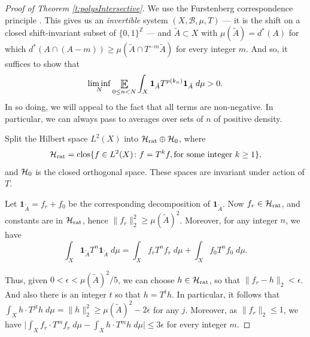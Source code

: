    
\begin{proof}
[Proof of Theorem \ref{t:polysIntersective}]
We use the Furstenberg correspondence principle \cite{MR0498471}. 
This gives us an \emph{invertible} system $(X,\mathcal B, \mu, T)$ --- it is the shift on a closed shift-invariant subset of $\{0,1\}^{\mathbb{Z}}$ --- 
and $\tilde A\subset X$ with $\mu(\tilde A)=d^\ast (A)$ for which 
$d^\ast(A\cap (A-m)) \geq \mu (\tilde A\cap T^{-m} \tilde A)$ for every integer $m$. 
And so, it suffices to show that 
\begin{equation} \label{eENA}
\liminf_N \Expectation _{0\leq n<N} \int_X \mathbf{1}_{\tilde A} T^{p(k_n)}  \mathbf{1}_{\tilde A} \;d\mu > 0. 
\end{equation}
In so doing, we will appeal to the fact that all terms are non-negative. In particular, we can always pass to averages over sets of $n$ of positive density. 


Split the Hilbert space $L^2(X)$ into $ \mathcal H _{\textup{rat}} \oplus \mathcal H _{\textup{0}}$, where 
\begin{equation}
 \mathcal H _{\textup{rat}}
 = \textup{clos}\{f\in L^2(X)\colon  
 f = T^k f, \textup{for some integer $k\geq 1$}   \}, 
 \end{equation}
and $\mathcal H _{\textup{0}}$ is the closed orthogonal space.  
These spaces are invariant under action of $T$.  


Let $\mathbf{1}_{\tilde A} = f_r + f_0$ be the corresponding decomposition of $\mathbf{1}_{\tilde A}$. Now $f_r \in \mathcal H _{\textup{rat}}$, and 
constants are in  $\mathcal H _{\textup{rat}}$, hence  $\lVert f_r\rVert_2^2 \geq  \mu(\tilde A)^2$. 
Moreover, for any integer $n$, we have 
\begin{equation}
    \int_X \mathbf{1}_{\tilde A}  T^n \mathbf{1}_{\tilde A}  \; d\mu 
    =
    \int_X f_r T^n f_r \;d\mu 
    +\int_X f_0 T^n f_0 \;d\mu . 
\end{equation}

 
Thus, given $0< \epsilon < \mu(\tilde A) ^2/5 $,  we can choose $h\in \mathcal H _{\textup{rat}}$,  so that 
$\lVert f_r - h \rVert_2 < \epsilon $. 
And also there is an integer $t$ so that  $h = T^t h$. 
In particular, it follows that $\int_X h \cdot T^{jt} h \; d\mu =\lVert h\rVert_2^2\geq 
\mu(\tilde A)^2- 2\epsilon $ for any $j$. 
Moreover, as $\lVert f_r\rVert_2\leq 1$, we have $\bigl\lvert\int_X f_r\cdot T^mf_r\;d\mu-\int_X h\cdot T^mh\;d\mu\bigr\rvert\leq 3\epsilon$ for every integer $m$.  




\end{proof}
